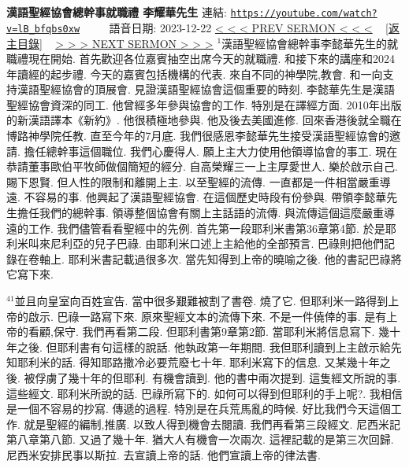 \documentclass{book}
\begin{document}
\section{}
\label{sec:lB_bfqbs0xw}
\textbf{漢語聖經協會總幹事就職禮 李耀華先生}
\newline
\newline
連結: \href{https://youtube.com/watch?v=lB_bfqbs0xw}{\texttt{https://youtube.com/watch?v=lB\_bfqbs0xw}} ~~~~ 語音日期: 2023-12-22
\newline
\newline
\hyperref[sec:h6V3lBcFI1I]{\small{< < < PREV SERMON < < <}}
~
\hyperref[sec:index]{\small{[返主目錄]}}
~
\hyperref[sec:uvYtXSSsYt0]{\small{> > > NEXT SERMON > > >}}
\newline
\newline
$^{1}$漢語聖經協會總幹事李懿華先生的就職禮現在開始.
首先歡迎各位嘉賓抽空出席今天的就職禮.
和接下來的講座和2024年讀經的起步禮.
今天的嘉賓包括機構的代表.
來自不同的神學院,教會.
和一向支持漢語聖經協會的頂展會.
見證漢語聖經協會這個重要的時刻.
李懿華先生是漢語聖經協會資深的同工.
他曾經多年參與協會的工作.
特別是在譯經方面.
2010年出版的新漢語譯本《新約》.
他很積極地參與.
他及後去美國進修.
回來香港後就全職在博路神學院任教.
直至今年的7月底.
我們很感恩李懿華先生接受漢語聖經協會的邀請.
擔任總幹事這個職位.
我們心慶得人.
願上主大力使用他領導協會的事工.
現在恭請董事歐伯平牧師做個簡短的經分.
自高榮耀三一上主厚愛世人.
樂於啟示自己.
賜下恩賢.
但人性的限制和離開上主.
以至聖經的流傳.
一直都是一件相當嚴重導遠.
不容易的事.
他興起了漢語聖經協會.
在這個歷史時段有份參與.
帶領李懿華先生擔任我們的總幹事.
領導整個協會有關上主話語的流傳.
與流傳這個這麼嚴重導遠的工作.
我們儘管看看聖經中的先例.
首先第一段耶利米書第36章第4節.
於是耶利米叫來尼利亞的兒子巴祿.
由耶利米口述上主給他的全部預言.
巴祿則把他們記錄在卷軸上.
耶利米書記載過很多次.
當先知得到上帝的曉喻之後.
他的書記巴祿將它寫下來.

$^{41}$並且向皇室向百姓宣告.
當中很多艱難被割了書卷.
燒了它.
但耶利米一路得到上帝的啟示.
巴祿一路寫下來.
原來聖經文本的流傳下來.
不是一件僥倖的事.
是有上帝的看顧,保守.
我們再看第二段.
但耶利書第9章第2節.
當耶利米將信息寫下.
幾十年之後.
但耶利書有句這樣的說話.
他執政第一年期間.
我但耶利讀到上主啟示給先知耶利米的話.
得知耶路撒冷必要荒廢七十年.
耶利米寫下的信息.
又某幾十年之後.
被俘虜了幾十年的但耶利.
有機會讀到.
他的書中兩次提到.
這隻經文所說的事.
這些經文.
耶利米所說的話.
巴祿所寫下的.
如何可以得到但耶利的手上呢?.
我相信是一個不容易的抄寫.
傳遞的過程.
特別是在兵荒馬亂的時候.
好比我們今天這個工作.
就是聖經的編制,推廣.
以致人得到機會去閱讀.
我們再看第三段經文.
尼西米記第八章第八節.
又過了幾十年.
猶大人有機會一次兩次.
這裡記載的是第三次回歸.
尼西米安排民事以斯拉.
去宣讀上帝的話.
他們宣讀上帝的律法書.
\end{document}
